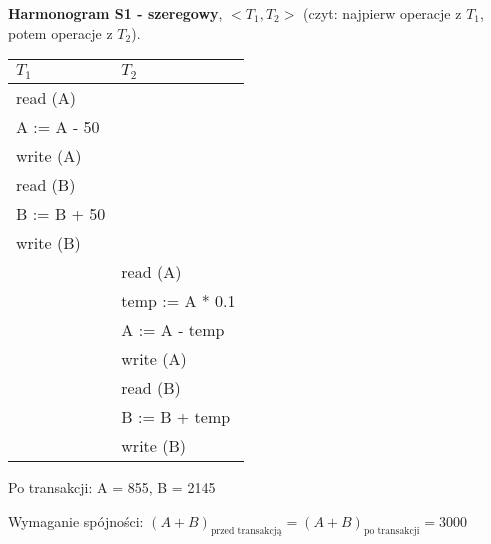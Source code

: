 \documentclass[main.tex]{subfiles}
\begin{document}
    \newpage

    \noindent \textbf{Harmonogram S1 - szeregowy}, $<T_1, T_2>$ (czyt: najpierw operacje z $T_1$, potem operacje z $T_2$).
    \begin{table}[H]
        \begin{center}
            \begin{tabular}{| p{6cm} | p{6cm} |}
                \hline
                $T_1$ & $T_2$\\
                \hline
                \hline
                read (A) &\\
                \hline
                A := A - 50 &\\
                \hline
                write (A) &\\
                \hline
                read (B) &\\
                \hline
                B := B + 50 &\\
                \hline
                write (B) &\\
                \hline
                & read (A)\\
                \hline
                & temp := A * 0.1\\
                \hline
                & A := A - temp\\
                \hline
                & write (A)\\
                \hline
                & read (B)\\
                \hline
                & B := B + temp\\
                \hline
                & write (B)\\
                \hline
            \end{tabular}
        \end{center}
    \end{table}

    Po transakcji: A = 855, B = 2145

    Wymaganie spójności:
    $( A + B )_{\text{przed transakcją}} = ( A + B )_{\text{po transakcji}} = 3000$\\

    \newpage
\end{document}
